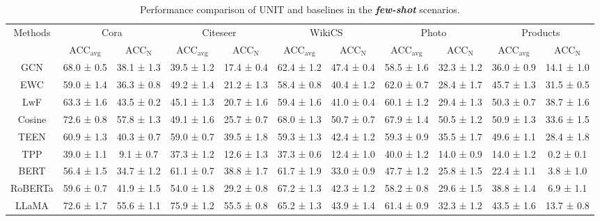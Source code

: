 \documentclass[sigconf]{acmart}
\begin{document}
\begin{table}
\setlength{\tabcolsep}{3.7pt}
\centering
\caption{Performance comparison of UNIT and baselines in the \textbf{\textit{few-shot}} scenarios. 
}
\begin{tabular}{ccccccccccc}
\toprule
\multirow{2}{*}{Methods} & \multicolumn{2}{c}{Cora} & \multicolumn{2}{c}{Citeseer} & \multicolumn{2}{c}{WikiCS} & \multicolumn{2}{c}{Photo} & \multicolumn{2}{c}{Products} \\
\cmidrule(lr){2-3} \cmidrule(lr){4-5} \cmidrule(lr){6-7} \cmidrule(lr){8-9} 
\cmidrule(lr){10-11} 
 & ACC$_{\text{avg}}$         & ACC$_\text{N}$        & ACC$_{\text{avg}}$         & ACC$_\text{N}$          & ACC$_{\text{avg}}$         & ACC$_\text{N}$        & ACC$_{\text{avg}}$         & ACC$_\text{N}$           & ACC$_{\text{avg}}$         & ACC$_\text{N}$    \\
\midrule
GCN    & 68.0 ± 0.5 & 38.1 ± 1.3 & 39.5 ± 1.2 & 17.4 ± 0.4 & 62.4 ± 1.2 & 47.4 ± 0.4 & 58.5 ± 1.6 & 32.3 ± 1.2 & 36.0 ± 0.9 & 14.1 ± 1.0 \\
EWC    & 59.0 ± 1.4 & 36.3 ± 0.8 & 49.2 ± 1.4 & 21.2 ± 1.3 & 58.4 ± 0.8 & 40.4 ± 1.2 & 62.0 ± 0.7 & 28.4 ± 1.7 & 45.7 ± 1.3 & 31.5 ± 0.5 \\
LwF    & 63.3 ± 1.6 & 43.5 ± 0.2 & 45.1 ± 1.3 & 20.7 ± 1.6 & 59.4 ± 1.6 & 41.0 ± 0.4 & 60.1 ± 1.2 & 29.4 ± 1.3 & 50.3 ± 0.7 & 38.7 ± 1.6 \\
Cosine & 72.6 ± 0.8 & 57.8 ± 1.3 & 49.1 ± 1.6 & 25.7 ± 0.7 & 68.0 ± 1.3 & 50.7 ± 0.7 & 67.9 ± 1.4 & 50.5 ± 1.2 & 50.9 ± 1.3 & 33.6 ± 1.5 \\
TEEN   & 60.9 ± 1.3 & 40.3 ± 0.7 & 59.0 ± 0.7 & 39.5 ± 1.8 & 59.3 ± 1.3 & 42.4 ± 1.2 & 59.3 ± 0.9 & 35.5 ± 1.7 & 49.6 ± 1.1 & 28.4 ± 1.8 \\
TPP    & 39.0 ± 1.1 & 9.1 ± 0.7 & 37.3 ± 1.2 & 12.6 ± 1.3 & 37.3 ± 0.6 & 12.4 ± 1.0 & 40.0 ± 1.2 & 14.0 ± 0.9 & 14.0 ± 1.2 & 0.2 ± 0.1 \\
\midrule
BERT   & 56.4 ± 1.5 & 34.7 ± 1.2 & 61.1 ± 0.7 & 38.8 ± 1.7 & 61.7 ± 1.9 & 33.0 ± 0.9 & 47.7 ± 1.2 & 25.8 ± 1.5 & 22.4 ± 1.1 & 3.8 ± 1.0 \\
RoBERTa & 59.6 ± 0.7 & 41.9 ± 1.5 & 54.0 ± 1.8 & 29.2 ± 0.8 & 67.2 ± 1.3 & 42.3 ± 1.2 & 58.2 ± 0.8 & 29.6 ± 1.5 & 38.8 ± 1.4 & 6.9 ± 1.1 \\
LLaMA  & 72.6 ± 1.7 & 55.6 ± 1.1 & 75.9 ± 1.2 & 55.5 ± 0.8 & 65.2 ± 1.3 & 43.9 ± 1.4 & 61.4 ± 0.9 & 32.3 ± 1.2 & 43.5 ± 1.6 & 13.7 ± 0.8 \\

\end{tabular}
\end{table}
\end{document}
